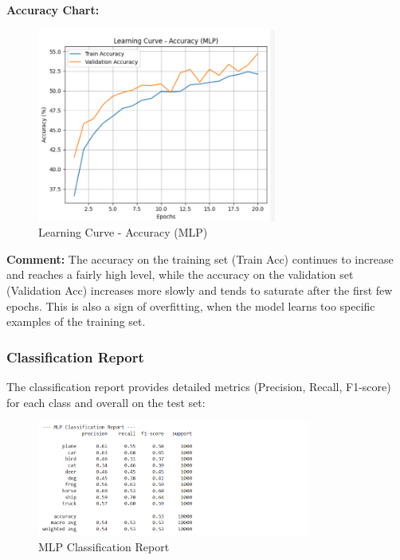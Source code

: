 \documentclass[12pt]{article}
\begin{document}
\textbf{Accuracy Chart:}
\begin{figure}[H]
    \centering
    \includegraphics[width=0.7\textwidth]{Screenshots/Ảnh chụp màn hình 2025-05-23 223040.png} %
    \caption{Learning Curve - Accuracy (MLP)}
    \label{fig:mlp_accuracy_chart}
\end{figure}
\textbf{Comment:} The accuracy on the training set (Train Acc) continues to increase and reaches a fairly high level, while the accuracy on the validation set (Validation Acc) increases more slowly and tends to saturate after the first few epochs. This is also a sign of overfitting, when the model learns too specific examples of the training set.

\subsubsection{Classification Report}
The classification report provides detailed metrics (Precision, Recall, F1-score) for each class and overall on the test set:
\begin{figure}[H]
    \centering
    \hspace*{4cm}\includegraphics[width=0.8\textwidth]{Screenshots/Ảnh chụp màn hình 2025-05-23 223142.png} %
    \caption{MLP Classification Report}
    \label{fig:mlp_classification_report}
\end{figure}
\end{document}

